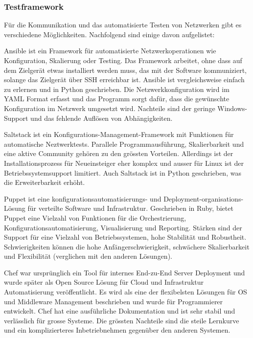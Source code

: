 \documentclass[]{subfiles}
\begin{document}
		\newpage

		\subsubsection{Testframework}
		Für die Kommunikation und das automatisierte Testen von Netzwerken gibt es verschiedene Möglichkeiten.
		Nachfolgend sind einige davon aufgelistet:
		
		Ansible ist ein Framework für automatisierte Netzwerkoperationen wie Konfiguration, Skalierung oder Testing.
		Das Framework arbeitet, ohne dass auf dem Zielgerät etwas installiert werden muss, das mit der Software kommuniziert, solange das Zielgerät über SSH erreichbar ist.
		Ansible ist vergleichsweise einfach zu erlernen und in Python geschrieben.
		Die Netzwerkkonfiguration wird im YAML Format erfasst und das Programm sorgt dafür, dass die gewünschte Konfiguration im Netzwerk umgesetzt wird.
		Nachteile sind der geringe Windows-Support und das fehlende Auflösen von Abhängigkeiten.

		Saltstack ist ein Konfigurations-Management-Framework mit Funktionen für automatische Neztwerktests.
		Parallele Programmausführung, Skalierbarkeit und eine aktive Community gehören zu den grössten Vorteilen.
		Allerdings ist der Installationsprozess für Neueinsteiger eher komplex und ausser für Linux ist der Betriebssystemsupport limitiert.
		Auch Saltstack ist in Python geschrieben, was die Erweiterbarkeit erhöht.
		
		Puppet ist eine konfigurationsautomatisierungs- und Deployment-organisations-Lösung für verteilte Software und Infrastruktur.
		Geschrieben in Ruby, bietet Puppet eine Vielzahl von Funktionen für die Orchestrierung, Konfigurationsautomatisierung, Visualisierung und Reporting.
		Stärken sind der Support für eine Vielzahl von Betriebssystemen, hohe Stabilität und Robustheit.
		Schwierigkeiten können die hohe Anfängerschwierigkeit, schwächere Skalierbarkeit und Flexibilität (verglichen mit den anderen Lösungen).

		Chef war ursprünglich ein Tool für internes End-zu-End Server Deployment und wurde später als Open Source Lösung für Cloud und Infrastruktur Automatisierung veröffentlicht.
		Es wird als eine der flexibelsten Lösungen für OS und Middleware Management beschrieben und wurde für Programmierer entwickelt.
		Chef hat eine ausführliche Dokumentation und ist sehr stabil und verlässlich für grosse Systeme.
		Die grössten Nachteile sind die steile Lernkurve und ein komplizierteres Inbetriebnehmen gegenüber den anderen Systemen.
\end{document}
